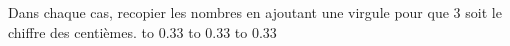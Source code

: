 \documentclass[exercice]{thedocument}%
\begin{document}
%
Dans chaque cas, recopier les nombres en ajoutant une virgule pour que 3 soit
le chiffre des centièmes.\vskip10pt\noindent
\hbox to 0.33%
\hbox to 0.33%
\hbox to 0.33\par
\end{document}
